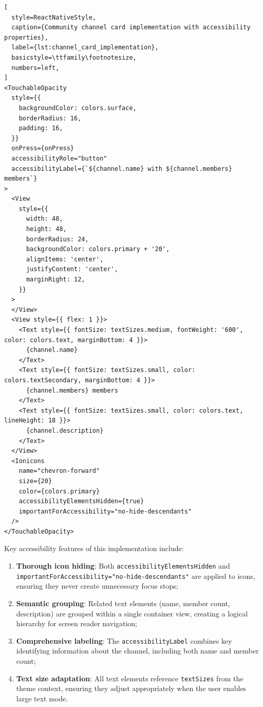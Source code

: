 \begin{lstlisting}[
  style=ReactNativeStyle,
  caption={Community channel card implementation with accessibility properties},
  label={lst:channel_card_implementation},
  basicstyle=\ttfamily\footnotesize,
  numbers=left,
]
<TouchableOpacity
  style={{
    backgroundColor: colors.surface,
    borderRadius: 16,
    padding: 16,
  }}
  onPress={onPress}
  accessibilityRole="button"
  accessibilityLabel={`${channel.name} with ${channel.members} members`}
>
  <View
    style={{
      width: 48,
      height: 48,
      borderRadius: 24,
      backgroundColor: colors.primary + '20',
      alignItems: 'center',
      justifyContent: 'center',
      marginRight: 12,
    }}
  >
  </View>
  <View style={{ flex: 1 }}>
    <Text style={{ fontSize: textSizes.medium, fontWeight: '600', color: colors.text, marginBottom: 4 }}>
      {channel.name}
    </Text>
    <Text style={{ fontSize: textSizes.small, color: colors.textSecondary, marginBottom: 4 }}>
      {channel.members} members
    </Text>
    <Text style={{ fontSize: textSizes.small, color: colors.text, lineHeight: 18 }}>
      {channel.description}
    </Text>
  </View>
  <Ionicons 
    name="chevron-forward" 
    size={20} 
    color={colors.primary}
    accessibilityElementsHidden={true}
    importantForAccessibility="no-hide-descendants"
  />
</TouchableOpacity>
\end{lstlisting}
\FloatBarrier

Key accessibility features of this implementation include:

\begin{enumerate}
    \item \textbf{Thorough icon hiding}: Both \texttt{accessibilityElementsHidden} and \texttt{importantForAccessibility="no-hide-descendants"} are applied to icons, ensuring they never create unnecessary focus stops;
    
    \item \textbf{Semantic grouping}: Related text elements (name, member count, description) are grouped within a single container view, creating a logical hierarchy for screen reader navigation;
    
    \item \textbf{Comprehensive labeling}: The \texttt{accessibilityLabel} combines key identifying information about the channel, including both name and member count;
    
    \item \textbf{Text size adaptation}: All text elements reference \texttt{textSizes} from the theme context, ensuring they adjust appropriately when the user enables large text mode.
\end{enumerate}

